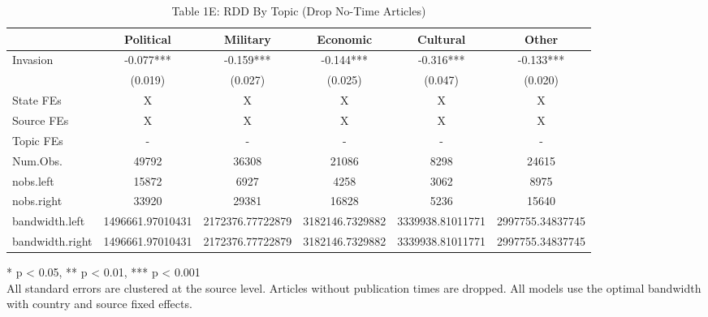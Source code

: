 \begin{table}[!t]
\caption{Table 1E: RDD By Topic (Drop No-Time Articles)} 
\fontsize{12.0pt}{14.4pt}\selectfont
\begin{tabular*}{\linewidth}{@{\extracolsep{\fill}}lccccc}
\toprule
  & Political & Military & Economic & Cultural & Other \\ 
\midrule\addlinespace[2.5pt]
Invasion & -0.077*** & -0.159*** & -0.144*** & -0.316*** & -0.133*** \\ 
{} & {(0.019)} & {(0.027)} & {(0.025)} & {(0.047)} & {(0.020)} \\ 
State FEs & X & X & X & X & X \\ 
Source FEs & X & X & X & X & X \\ 
Topic FEs & - & - & - & - & - \\ 
Num.Obs. & 49792 & 36308 & 21086 & 8298 & 24615 \\ 
nobs.left & 15872 & 6927 & 4258 & 3062 & 8975 \\ 
nobs.right & 33920 & 29381 & 16828 & 5236 & 15640 \\ 
bandwidth.left & 1496661.97010431 & 2172376.77722879 & 3182146.7329882 & 3339938.81011771 & 2997755.34837745 \\ 
bandwidth.right & 1496661.97010431 & 2172376.77722879 & 3182146.7329882 & 3339938.81011771 & 2997755.34837745 \\ 
\bottomrule
\end{tabular*}
\begin{minipage}{\linewidth}
* p < 0.05, ** p < 0.01, *** p < 0.001\\
All standard errors are clustered at the source level. Articles without
publication times are dropped. All models use the optimal bandwidth with country
and source fixed effects.\\
\end{minipage}
\end{table}

